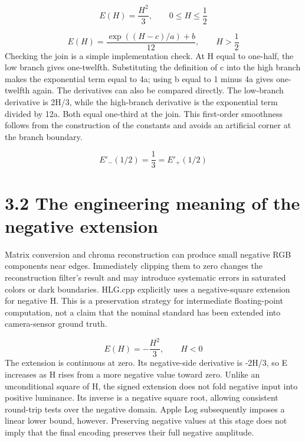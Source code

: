 \documentclass[11pt,a4paper,openany]{book}
\begin{document}
\begin{equation}
E(H)=\frac{H^2}{3},\qquad 0\leq H\leq\frac12
\end{equation}

\begin{equation}
E(H)=\frac{\exp((H-c)/a)+b}{12},\qquad H>\frac12
\end{equation}
Checking the join is a simple implementation check. At H equal to one-half, the low branch gives one-twelfth. Substituting the definition of c into the high branch makes the exponential term equal to 4a; using b equal to 1 minus 4a gives one-twelfth again. The derivatives can also be compared directly. The low-branch derivative is 2H/3, while the high-branch derivative is the exponential term divided by 12a. Both equal one-third at the join. This first-order smoothness follows from the construction of the constants and avoids an artificial corner at the branch boundary.


\begin{equation}
E'_-(1/2)=\frac13=E'_+(1/2)
\end{equation}

\section*{3.2 The engineering meaning of the negative extension}
Matrix conversion and chroma reconstruction can produce small negative RGB components near edges. Immediately clipping them to zero changes the reconstruction filter's result and may introduce systematic errors in saturated colors or dark boundaries. HLG.cpp explicitly uses a negative-square extension for negative H. This is a preservation strategy for intermediate floating-point computation, not a claim that the nominal standard has been extended into camera-sensor ground truth.


\begin{equation}
E(H)=-\frac{H^2}{3},\qquad H<0
\end{equation}
The extension is continuous at zero. Its negative-side derivative is -2H/3, so E increases as H rises from a more negative value toward zero. Unlike an unconditional square of H, the signed extension does not fold negative input into positive luminance. Its inverse is a negative square root, allowing consistent round-trip tests over the negative domain. Apple Log subsequently imposes a linear lower bound, however. Preserving negative values at this stage does not imply that the final encoding preserves their full negative amplitude.
\end{document}
